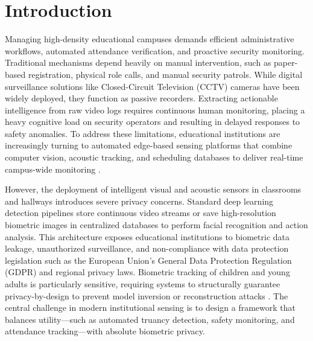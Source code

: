 \documentclass[12pt,a4paper,oneside]{report}
\begin{document}
\vfill

\newpage
{}
\setcounter{page}{1}

\chapter{Introduction}
\thispagestyle{empty} 

Managing high-density educational campuses demands efficient administrative workflows, automated attendance verification, and proactive security monitoring. Traditional mechanisms depend heavily on manual intervention, such as paper-based registration, physical role calls, and manual security patrols. While digital surveillance solutions like Closed-Circuit Television (CCTV) cameras have been widely deployed, they function as passive recorders. Extracting actionable intelligence from raw video logs requires continuous human monitoring, placing a heavy cognitive load on security operators and resulting in delayed responses to safety anomalies. To address these limitations, educational institutions are increasingly turning to automated edge-based sensing platforms that combine computer vision, acoustic tracking, and scheduling databases to deliver real-time campus-wide monitoring \cite{satyanarayanan2017emergence, shi2016edge, minalah2020smart}.

However, the deployment of intelligent visual and acoustic sensors in classrooms and hallways introduces severe privacy concerns. Standard deep learning detection pipelines store continuous video streams or save high-resolution biometric images in centralized databases to perform facial recognition and action analysis. This architecture exposes educational institutions to biometric data leakage, unauthorized surveillance, and non-compliance with data protection legislation such as the European Union's General Data Protection Regulation (GDPR) and regional privacy laws. Biometric tracking of children and young adults is particularly sensitive, requiring systems to structurally guarantee privacy-by-design to prevent model inversion or reconstruction attacks \cite{fredrikson2015model}. The central challenge in modern institutional sensing is to design a framework that balances utility---such as automated truancy detection, safety monitoring, and attendance tracking---with absolute biometric privacy.
\end{document}
